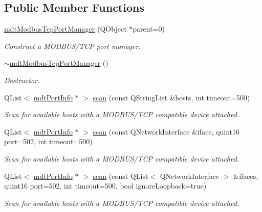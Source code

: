 \subsection*{Public Member Functions}
\begin{DoxyCompactItemize}
\item 
\hyperlink{classmdt_modbus_tcp_port_manager_a2f65f779bbad19d9d3f85ef35220ffb8}{mdtModbusTcpPortManager} (QObject $\ast$parent=0)
\begin{DoxyCompactList}\small\item\em Construct a MODBUS/TCP port manager. \end{DoxyCompactList}\item 
\hyperlink{classmdt_modbus_tcp_port_manager_aabe51a50a53c6b23884cc4862730b731}{$\sim$mdtModbusTcpPortManager} ()
\begin{DoxyCompactList}\small\item\em Destructor. \end{DoxyCompactList}\item 
QList$<$ \hyperlink{classmdt_port_info}{mdtPortInfo} $\ast$ $>$ \hyperlink{classmdt_modbus_tcp_port_manager_a216ee2495440be4eefb2faf9da3c9e47}{scan} (const QStringList \&hosts, int timeout=500)
\begin{DoxyCompactList}\small\item\em Scan for available hosts with a MODBUS/TCP compatible device attached. \end{DoxyCompactList}\item 
QList$<$ \hyperlink{classmdt_port_info}{mdtPortInfo} $\ast$ $>$ \hyperlink{classmdt_modbus_tcp_port_manager_a7cfd5dcde142cd262925974b43e58bff}{scan} (const QNetworkInterface \&iface, quint16 port=502, int timeout=500)
\begin{DoxyCompactList}\small\item\em Scan for available hosts with a MODBUS/TCP compatible device attached. \end{DoxyCompactList}\item 
QList$<$ \hyperlink{classmdt_port_info}{mdtPortInfo} $\ast$ $>$ \hyperlink{classmdt_modbus_tcp_port_manager_a2f1128e1f564a785e35b2e9b16bc990f}{scan} (const QList$<$ QNetworkInterface $>$ \&ifaces, quint16 port=502, int timeout=500, bool ignoreLoopback=true)
\begin{DoxyCompactList}\small\item\em Scan for available hosts with a MODBUS/TCP compatible device attached. \end{DoxyCompactList}\item 

\end{DoxyCompactItemize}
